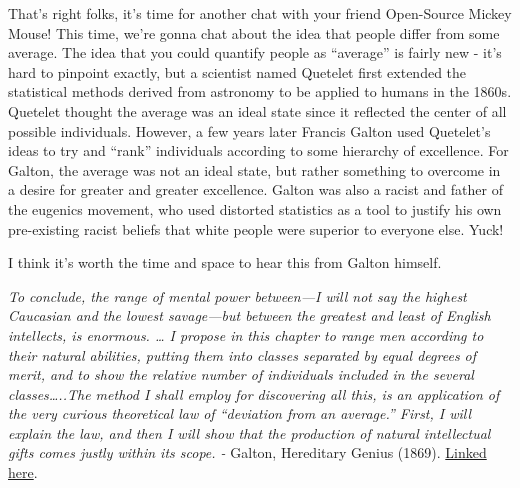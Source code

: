 \documentclass[
  letterpaper,
  DIV=11,
  numbers=noendperiod,
  oneside]{scrreprt}
\begin{document}
\begin{tcolorbox}[enhanced jigsaw, toptitle=1mm, toprule=.15mm, rightrule=.15mm, breakable, left=2mm, colbacktitle=quarto-callout-warning-color!10!white, colback=white, opacityback=0, coltitle=black, bottomtitle=1mm, opacitybacktitle=0.6, titlerule=0mm, leftrule=.75mm, arc=.35mm, bottomrule=.15mm, title=\textcolor{quarto-callout-warning-color}{\faExclamationTriangle}\hspace{0.5em}{Culture in Statistics : The Normal Curve}, colframe=quarto-callout-warning-color-frame]

That's right folks, it's time for another chat with your friend
Open-Source Mickey Mouse! This time, we're gonna chat about the idea
that people differ from some average. The idea that you could quantify
people as ``average'' is fairly new - it's hard to pinpoint exactly, but
a scientist named Quetelet first extended the statistical methods
derived from astronomy to be applied to humans in the
1860s\footnotemark{}. Quetelet thought the average was an ideal state
since it reflected the center of all possible individuals. However, a
few years later Francis Galton used Quetelet's ideas to try and ``rank''
individuals according to some hierarchy of excellence. For Galton, the
average was not an ideal state, but rather something to overcome in a
desire for greater and greater excellence. Galton was also a racist and
father of the eugenics movement, who used distorted statistics as a tool
to justify his own pre-existing racist beliefs that white people were
superior to everyone else. Yuck!

I think it's worth the time and space to hear this from Galton himself.

\emph{To conclude, the range of mental power between---I will not say
the highest Caucasian and the lowest savage---but between the greatest
and least of English intellects, is enormous. \ldots{} I propose in this
chapter to range men according to their natural abilities, putting them
into classes separated by equal degrees of merit, and to show the
relative number of individuals included in the several
classes\ldots..The method I shall employ for discovering all this, is an
application of the very curious theoretical law of ``deviation from an
average.'' First, I will explain the law, and then I will show that the
production of natural intellectual gifts comes justly within its scope.
-} Galton, Hereditary Genius (1869).
\href{https://galton.org/books/hereditary-genius/text/v5/galton-1869-hereditary-genius-v5.htm}{Linked
here}.


\end{tcolorbox}
\end{document}
